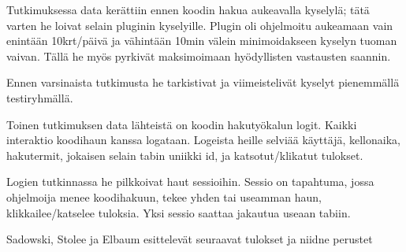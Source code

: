 \documentclass[finnish]{../tktltiki2}
\theoremstyle{definition}
\theoremstyle{remark}
\begin{document}
Tutkimuksessa data kerättiin ennen koodin hakua aukeavalla kyselylä; tätä varten he loivat selain pluginin kyselyille. Plugin oli ohjelmoitu aukeamaan vain enintään 10krt/päivä ja vähintään 10min välein minimoidakseen kyselyn tuoman vaivan. Tällä he myös pyrkivät maksimoimaan hyödyllisten vastausten saannin.

Ennen varsinaista tutkimusta he tarkistivat ja viimeistelivät kyselyt pienemmällä testiryhmällä.

Toinen tutkimuksen data lähteistä on koodin hakutyökalun logit. Kaikki interaktio koodihaun kanssa logataan. Logeista heille selviää käyttäjä, kellonaika, hakutermit, jokaisen selain tabin uniikki id, ja katsotut/klikatut tulokset.

Logien tutkinnassa he pilkkoivat haut sessioihin. Sessio on tapahtuma, jossa ohjelmoija menee koodihakuun, tekee yhden tai useamman haun, klikkailee/katselee tuloksia. Yksi sessio saattaa jakautua useaan tabiin.



Sadowski, Stolee ja Elbaum esittelevät seuraavat tulokset ja niidne perustet




%
%
% 
%







%
\end{document}
